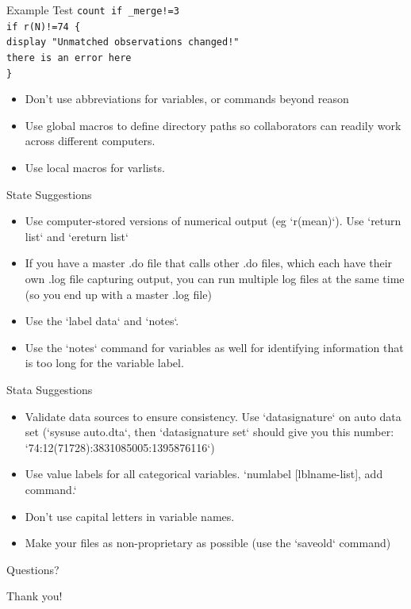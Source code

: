 \documentclass{beamer}
\begin{document}
\begin{frame}{Example Test}
\texttt{count if \_merge!=3 \\ if r(N)!=74 \{ \\ display "Unmatched observations changed!" \\ there is an error here \\  \}   }
\end{frame}
   
\begin{frame}
 \begin{itemize}
\item	Don't use abbreviations for variables, or commands beyond reason
\item	Use global macros to define directory paths so collaborators can readily work across different computers.
\item	Use local macros for varlists.
\end{itemize}
\end{frame}


\begin{frame}{State Suggestions}
\begin{itemize}
\item Use computer-stored versions of numerical output (eg `r(mean)`). Use `return list` and `ereturn list`
\item	If you have a master .do file that calls other .do files, which each have their own .log file capturing output, you can run multiple log files at the same time (so you end up with a master .log file)
\item	Use the `label data` and `notes`.
\item	Use the `notes` command for variables as well for identifying information that is too long for the variable label.
\end{itemize}
\end{frame}


\begin{frame}{Stata Suggestions}
\begin{itemize}
\item	Validate data sources to ensure consistency. Use `datasignature` on auto data set (`sysuse auto.dta`, then `datasignature set` should give you this number: `74:12(71728):3831085005:1395876116`) 
\item	Use value labels for all categorical variables. `numlabel [lblname-list], add command.`  
\item	Don't use capital letters in variable names.
\item	Make your files as non-proprietary as possible (use the `saveold` command) 

\end{itemize}
\end{frame}


\begin{frame}
\begin{center}
Questions?
\vspace{1in}


\Huge{Thank you!}
\end{center}
\end{frame}
\end{document}
